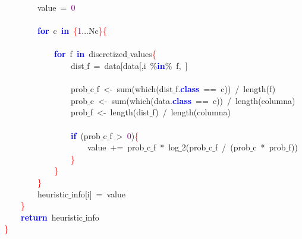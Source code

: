 \mbox{}\ \ \ \ \ \ \ \ value\ \textcolor{BrickRed}{=}\ \textcolor{Purple}{0} \\
\mbox{} \\
\mbox{}\ \ \ \ \ \ \ \ \textbf{\textcolor{Blue}{for}}\ c\ \textbf{\textcolor{Blue}{in}}\ \textcolor{Red}{\{}\textcolor{Purple}{1}\textcolor{BrickRed}{...}Nc\textcolor{Red}{\}\{} \\
\mbox{} \\
\mbox{}\ \ \ \ \ \ \ \ \ \ \ \ \textbf{\textcolor{Blue}{for}}\ f\ \textbf{\textcolor{Blue}{in}}\ discretized$\_$values\textcolor{Red}{\{} \\
\mbox{}\ \ \ \ \ \ \ \ \ \ \ \ \ \ \ \ dist$\_$f\ \textcolor{BrickRed}{=}\ data\textcolor{BrickRed}{[}data\textcolor{BrickRed}{[,}i\ \textcolor{BrickRed}{\%}\textbf{\textcolor{Blue}{in}}\textcolor{BrickRed}{\%}\ f\textcolor{BrickRed}{,}\ \textcolor{BrickRed}{]} \\
\mbox{} \\
\mbox{}\ \ \ \ \ \ \ \ \ \ \ \ \ \ \ \ prob$\_$c$\_$f\ \textcolor{BrickRed}{\textless{}-}\ sum\textcolor{BrickRed}{(}which\textcolor{BrickRed}{(}dist$\_$f\textcolor{BrickRed}{.}\textbf{\textcolor{Blue}{class}}\ \textcolor{BrickRed}{==}\ c\textcolor{BrickRed}{))}\ \textcolor{BrickRed}{/}\ length\textcolor{BrickRed}{(}f\textcolor{BrickRed}{)} \\
\mbox{}\ \ \ \ \ \ \ \ \ \ \ \ \ \ \ \ prob$\_$c\ \textcolor{BrickRed}{\textless{}-}\ sum\textcolor{BrickRed}{(}which\textcolor{BrickRed}{(}data\textcolor{BrickRed}{.}\textbf{\textcolor{Blue}{class}}\ \textcolor{BrickRed}{==}\ c\textcolor{BrickRed}{))}\ \textcolor{BrickRed}{/}\ length\textcolor{BrickRed}{(}columna\textcolor{BrickRed}{)} \\
\mbox{}\ \ \ \ \ \ \ \ \ \ \ \ \ \ \ \ prob$\_$f\ \textcolor{BrickRed}{\textless{}-}\ length\textcolor{BrickRed}{(}dist$\_$f\textcolor{BrickRed}{)}\ \textcolor{BrickRed}{/}\ length\textcolor{BrickRed}{(}columna\textcolor{BrickRed}{)} \\
\mbox{} \\
\mbox{}\ \ \ \ \ \ \ \ \ \ \ \ \ \ \ \ \textbf{\textcolor{Blue}{if}}\ \textcolor{BrickRed}{(}prob$\_$c$\_$f\ \textcolor{BrickRed}{\textgreater{}}\ \textcolor{Purple}{0}\textcolor{BrickRed}{)}\textcolor{Red}{\{} \\
\mbox{}\ \ \ \ \ \ \ \ \ \ \ \ \ \ \ \ \ \ \ \ value\ \textcolor{BrickRed}{+=}\ prob$\_$c$\_$f\ \textcolor{BrickRed}{*}\ log$\_$2\textcolor{BrickRed}{(}prob$\_$c$\_$f\ \textcolor{BrickRed}{/}\ \textcolor{BrickRed}{(}prob$\_$c\ \textcolor{BrickRed}{*}\ prob$\_$f\textcolor{BrickRed}{))} \\
\mbox{}\ \ \ \ \ \ \ \ \ \ \ \ \ \ \ \ \textcolor{Red}{\}} \\
\mbox{}\ \ \ \ \ \ \ \ \ \ \ \ \textcolor{Red}{\}} \\
\mbox{}\ \ \ \ \ \ \ \ \textcolor{Red}{\}} \\
\mbox{}\ \ \ \ \ \ \ \ heuristic$\_$info\textcolor{BrickRed}{[}i\textcolor{BrickRed}{]}\ \textcolor{BrickRed}{=}\ value \\
\mbox{}\ \ \ \ \textcolor{Red}{\}} \\
\mbox{}\ \ \ \ \textbf{\textcolor{Blue}{return}}\ heuristic$\_$info \\
\mbox{}\textcolor{Red}{\}} \\
\mbox{}
